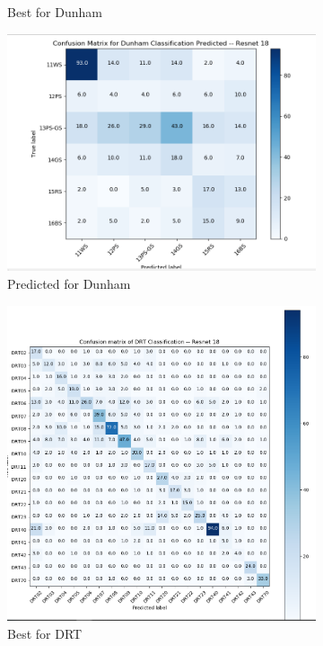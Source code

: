 \begin{figure}
\begin{subfigure}{.5\textwidth}
  \caption{Best for Dunham}
  \label{fig:rescm_dunham}
\end{subfigure}%
\begin{subfigure}{.5\textwidth}
  \centering
  \includegraphics[width=.8\linewidth]{figures/04-dunham_pred.PNG}
  \caption{Predicted for Dunham}
  \label{fig:rescmpred_dunham}
\end{subfigure}
\begin{subfigure}{.5\textwidth}
  \centering
  \includegraphics[width=.8\linewidth]{figures/04-DRT_best.PNG}
  \caption{Best for DRT}
  \label{fig:rescm_drt}
\end{subfigure}%
\begin{subfigure}{.5\textwidth}
  \centering

\end{subfigure}
\end{figure}

